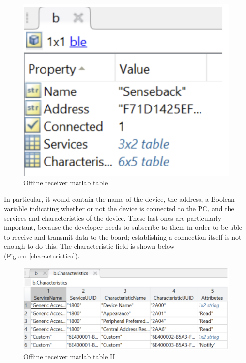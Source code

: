 \documentclass{Configuration_Files/PoliMi3i_thesis}
\begin{document}
\begin{figure}[H]
    \centering
    \includegraphics[scale=0.6]{Board Windows PC/4.png}
    \caption{Offline receiver matlab table}
    \label{boardwindows_4}
\end{figure}

In particular, it would contain the name of the device, the address, a Boolean variable indicating whether or not the device is connected to the PC, and the services and characteristics of the device. These last ones are particularly important, because the developer needs to subscribe to them in order to be able to receive and transmit data to the board; establishing a connection itself is not enough to do this. The characteristic field is shown below (Figure~\ref{characteristics}).

\begin{figure}[H]
    \centering
    \includegraphics[scale=0.6]{Board Windows PC/5.png}
    \caption{Offline receiver matlab table II}
    \label{boardwindows_5}
\end{figure}
\end{document}
